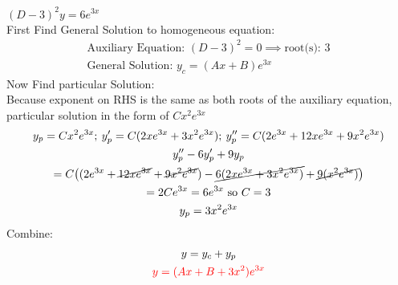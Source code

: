 \item [10.] $(D-3)^2y=6e^{3x}$\\[2mm]
First Find General Solution to homogeneous equation:
\begin{gather*}
    \text{Auxiliary Equation: } (D-3)^2=0 \implies \text{root(s): } 3\\
    \text{General Solution: } y_c=(Ax+B)e^{3x}
\end{gather*}
Now Find particular Solution:\\
Because exponent on RHS is the same as both roots of the auxiliary equation, particular solution in the form of $Cx^2e^{3x}$
\begin{gather*}
    y_p=Cx^2e^{3x};\:y_p'=C(2xe^{3x}+3x^2e^{3x});\:y_p''=C(2e^{3x}+12xe^{3x}+9x^2e^{3x})\\
    y_p''-6y_p'+9y_p\\=C\big(
        (2e^{3x}+\cancel{12xe^{3x}}+\cancel{9x^2e^{3x}})
        -\cancel{6(2xe^{3x}+3x^2e^{3x})}
        +\cancel{9(x^2e^{3x})}
    \big)\\
    =2Ce^{3x} = 6e^{3x} \text{ so } C=3\\
    y_p = 3x^2e^{3x}
\end{gather*}
Combine:
\begin{gather*}
    y=y_c+y_p\\
    \textcolor{red}{y = (Ax+B+3x^2)e^{3x}}
\end{gather*}